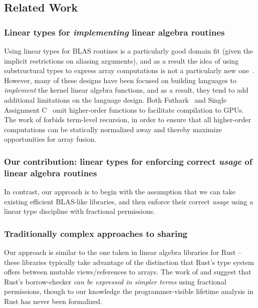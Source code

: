 \subsection{Related Work}

\subsubsection{Linear types for \emph{implementing} linear algebra routines}

Using linear types for BLAS routines is a particularly good domain fit (given
the implicit restrictions on aliasing arguments), and as a result the idea of
using substructural types to express array computations is not a particularly
new one~\cite{scholz,henriksen,bernardy2016}.  However, many of these designs
have been focused on building languages to \emph{implement} the kernel linear
algebra functions, and as a result, they tend to add additional limitations on
the language design. Both Futhark~\cite{henriksen} and Single Assignment
C~\cite{scholz} omit higher-order functions to facilitate compilation to GPUs.
The work of \cite{bernardy2016} forbids term-level recursion, in order to
ensure that all higher-order computations can be statically normalized away and
thereby maximize opportunities for array fusion.

\subsubsection{Our contribution: linear types for enforcing correct
    \emph{usage} of linear algebra routines}

In contrast, our approach is to begin with the assumption that we can take
existing efficient BLAS-like libraries, and then enforce their correct
\emph{usage} using a linear type discipline with fractional permissions. 

\subsubsection{Traditionally complex approaches to sharing}

Our approach is similar to the one taken in linear algebra libraries for Rust
-- these libraries typically take advantage of the distinction that Rust's type
system offers between mutable views/references to arrays.  The work of
\cite{weiss} and \cite{rustbelt} suggest that Rust's borrow-checker \emph{can
be expressed in simpler terms} using fractional permissions, though to our
knowledge the programmer-visible lifetime analysis in Rust has never been
formalized.

